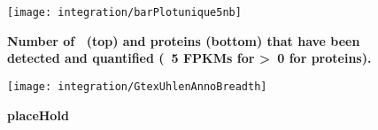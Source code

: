 \begin{figure}%
    \texttt{[image: integration/barPlotunique5nb]}\centering
    \caption[Number of \mRNAs\ (\geq\ 5 \glspl{FPKM}) and proteins detected
    (at specific thresholds) only in one unique
    tissue]{\label{fig:barPlotunique5nb}\textbf{Number of \mRNAs\ (top)
    and proteins (bottom) that have been detected and quantified
    (\geq\ 5 \glspl{FPKM} for \mRNA\; \textgreater\ 0 for proteins).}}
\end{figure}


\begin{figure}[!htbp]
\texttt{[image: integration/GtexUhlenAnnoBreadth]}
\caption[placeHold]{\label{fig:breadthColGtexUhlen}\textbf{placeHold}}
\end{figure}




